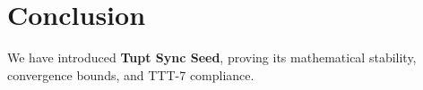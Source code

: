 \section{Conclusion}
We have introduced \textbf{Tupt Sync Seed}, proving its mathematical stability, convergence bounds, and TTT-7 compliance.